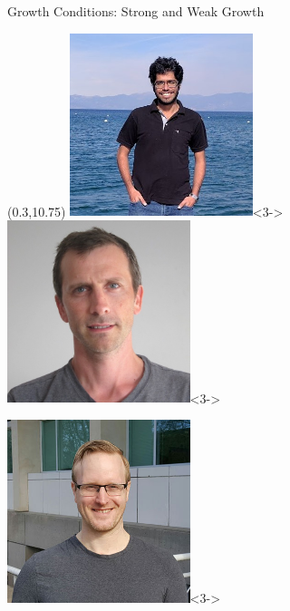 \documentclass[mathserif,notheorems, hyperref={colorlinks, citecolor=blue, urlcolor=blue, linkcolor=blue}]{beamer}
\begin{document}
\begin{frame}{Growth Conditions: Strong and Weak Growth}
	\begin{textblock}{2.5}(0.3,10.75)
		\centering
		\includegraphics[width=0.4\textwidth]{collaborators/sharan}<3->
		\includegraphics[width=0.4\textwidth]{collaborators/francis}<3->

		\vspace{0.5ex}

		\includegraphics[width=0.4\textwidth]{collaborators/mark}<3->
	\end{textblock}


\end{frame}
\end{document}

